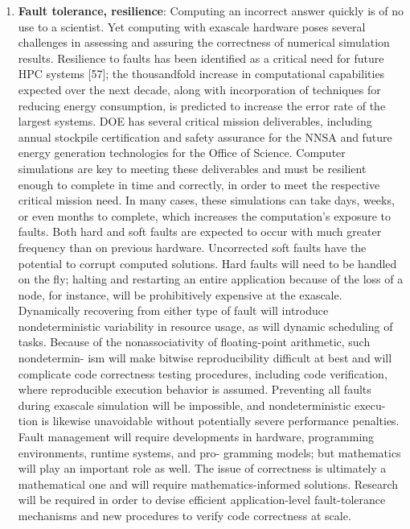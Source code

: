 \begin{enumerate}
	\item \textbf{Fault tolerance, resilience}: Computing an incorrect answer quickly is of no use to a scientist. Yet computing with exascale hardware poses several challenges in assessing and assuring the correctness of numerical simulation results. Resilience to faults has been identified as a critical need for future HPC systems [57]; the thousandfold increase in computational capabilities expected over the next decade, along with incorporation of techniques for reducing energy consumption, is predicted to increase the error rate of the largest systems. DOE has several critical mission deliverables, including annual stockpile certification and safety assurance for the NNSA and future energy generation technologies for the Office of Science. Computer simulations are key to meeting these deliverables and must be resilient enough to complete in time and correctly, in order to meet the respective critical mission need. In many cases, these simulations can take days, weeks, or even months to complete, which increases the computation’s exposure to faults. Both hard and soft faults are expected to occur with much greater frequency than on previous hardware. Uncorrected soft faults have the potential to corrupt computed solutions. Hard faults will need to be handled on the fly; halting and restarting an entire application because of the loss of a node, for instance, will be prohibitively expensive at the exascale. Dynamically recovering from either type of fault will introduce nondeterministic variability in resource usage, as will dynamic scheduling of tasks. Because of the nonassociativity of floating-point arithmetic, such nondetermin- ism will make bitwise reproducibility difficult at best and will complicate code correctness testing procedures, including code verification, where reproducible execution behavior is assumed. Preventing all faults during exascale simulation will be impossible, and nondeterministic execu- tion is likewise unavoidable without potentially severe performance penalties. Fault management will require developments in hardware, programming environments, runtime systems, and pro- gramming models; but mathematics will play an important role as well. The issue of correctness is ultimately a mathematical one and will require mathematics-informed solutions. Research will be required in order to devise efficient application-level fault-tolerance mechanisms and new procedures to verify code correctness at scale.

\end{enumerate}

\clearemptydoublepage